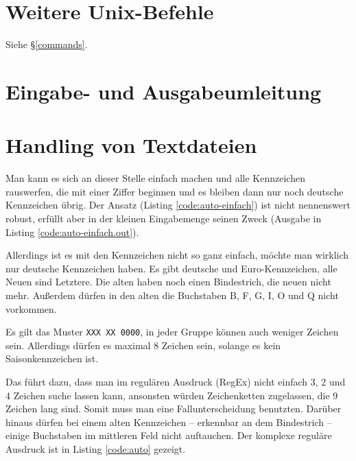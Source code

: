 \section{Weitere Unix-Befehle}

Siehe §\ref{commands}.

\section{Eingabe- und Ausgabeumleitung}


\section{Handling von Textdateien}

Man kann es sich an dieser Stelle einfach machen und alle Kennzeichen rauswerfen, die mit einer Ziffer beginnen und es bleiben dann nur noch deutsche Kennzeichen übrig. Der Ansatz (Listing \ref{code:auto-einfach}) ist nicht nennenswert robust, erfüllt aber in der kleinen Eingabemenge seinen Zweck (Ausgabe in Listing \ref{code:auto-einfach.out}).



Allerdings ist es mit den Kennzeichen nicht so ganz einfach, möchte man wirklich nur deutsche Kennzeichen haben. Es gibt deutsche und Euro-Kennzeichen, alle Neuen sind Letztere. Die alten haben noch einen Bindestrich, die neuen nicht mehr. Außerdem dürfen in den alten die Buchstaben B, F, G, I, O und Q nicht vorkommen.\cite{wiki-kfz}

Es gilt das Muster \texttt{XXX XX 0000}, in jeder Gruppe können auch weniger Zeichen sein. Allerdings dürfen es maximal 8 Zeichen sein, solange es kein Saisonkennzeichen ist.

Das führt dazu, dass man im regulären Ausdruck (RegEx) nicht einfach 3, 2 und 4 Zeichen suche lassen kann, ansonsten würden Zeichenketten zugelassen, die 9 Zeichen lang sind. Somit muss man eine Fallunterscheidung benutzten. Darüber hinaus dürfen bei einem alten Kennzeichen -- erkennbar an dem Bindestrich -- einige Buchstaben im mittleren Feld nicht auftauchen. Der komplexe reguläre Ausdruck ist in Listing \ref{code:auto} gezeigt.

